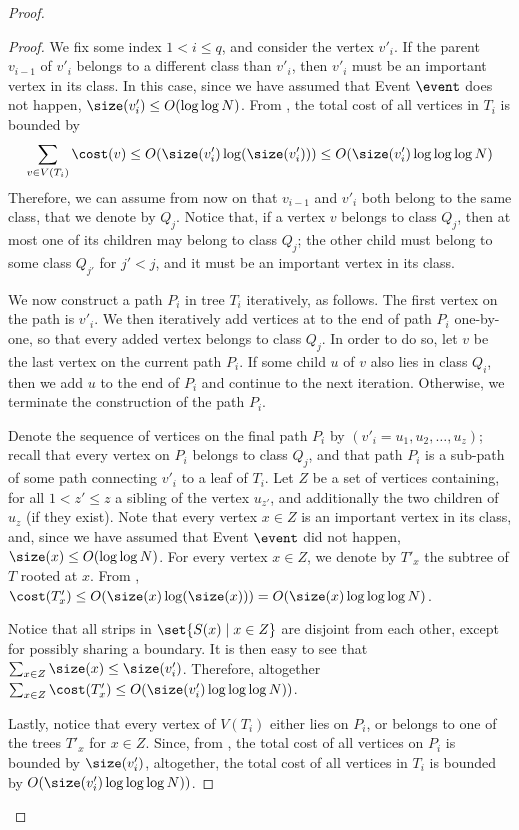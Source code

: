 \begin{proof}
\begin{proof}{}
We fix some index $1<i\leq q$, and consider the vertex $v'_i$. If the parent $v_{i-1}$ of $v'_i$ belongs to a different class than $v'_i$, then $v'_i$ must be an important vertex in its class. In this case, since we have assumed that Event $\event$ does not happen, $\size(v'_i)\leq O(\log\log N)$. 
From , the total cost of all vertices in $T_i$ is bounded by 
$$\sum_{v \in V(T_i)} \cost(v) \leq O(\size(v'_i)\log(\size(v'_i)))\leq O(\size(v'_i)\log\log\log N)$$  
Therefore, we can assume from now on that $v_{i-1}$ and $v'_i$ both belong to the same class, that we denote by $Q_j$.
Notice that, if a vertex $v$ belongs to class $Q_j$, then at most one of its children may belong to class $Q_j$; the other child must belong to some class $Q_{j'}$ for $j'<j$, and it must be an important vertex in its class.

We now construct a path $P_i$ in tree $T_i$ iteratively, as follows. 
The first vertex on the path is $v'_i$. 
We then iteratively add vertices at to the end of path $P_i$ one-by-one, so that every added vertex belongs to class $Q_j$. 
In order to do so, let $v$ be the last vertex on the current path $P_i$. 
If some child $u$ of $v$ also lies in class $Q_i$, then we add $u$ to the end of $P_i$ and continue to the next iteration. 
Otherwise, we terminate the construction of the path $P_i$.


Denote the sequence of vertices on the final path $P_i$ by $(v'_i=u_1,u_2,\ldots,u_z)$; recall that every vertex on $P_i$ belongs to class $Q_j$, and that path $P_i$ is a sub-path of some path connecting $v'_i$ to a leaf of $T_i$. Let $Z$ be a set of vertices containing, for all $1<z'\leq z$ a sibling of the vertex $u_{z'}$, and additionally the two children of $u_z$ (if they exist). Note that every vertex $x\in Z$ is an important vertex in its class, and, since we have assumed that Event $\event$ did not happen, $\size(x)\leq O(\log\log N)$. For every vertex $x\in Z$, we denote by $T'_x$ the subtree of $T$ rooted at $x$. From , $\cost(T'_x)\leq O(\size(x)\log(\size(x)))=O(\size(x)\log\log\log N)$.

Notice that all strips in $\set{S(x)\mid x\in Z}$ are disjoint from each other, except for possibly sharing a boundary. It is then easy to see that $\sum_{x\in Z}\size(x)\leq \size(v'_i)$. Therefore, altogether $\sum_{x\in Z}\cost(T'_x)\leq O(\size(v'_i)\log\log\log N))$.

Lastly, notice that every vertex of $V(T_i)$ either lies on $P_i$, or belongs to one of the trees $T'_x$ for $x\in Z$. Since, from , the total cost of all vertices on $P_i$ is bounded by $\size(v'_i)$, altogether, the total cost of all vertices in $T_i$ is bounded by $O(\size(v'_i)\log\log\log N))$.
\end{proof}
\end{proof}

